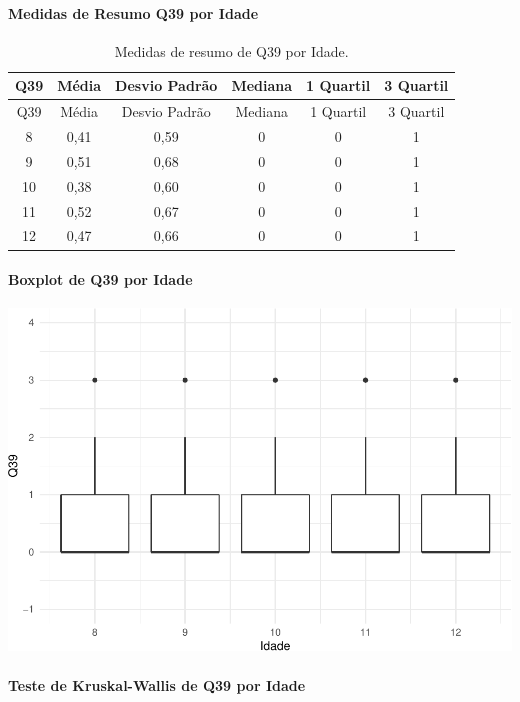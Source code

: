 \documentclass[]{article}
\let\oldparagraph\paragraph
\renewcommand{\paragraph}[1]{\oldparagraph{#1}\mbox{}}
\begin{document}
\cleardoublepage

\hypertarget{medidas-de-resumo-q39-por-idade}{%
\paragraph{Medidas de Resumo Q39 por Idade}\label{medidas-de-resumo-q39-por-idade}}

\begin{longtable}[]{@{}cccccc@{}}
\caption{\label{tab:unnamed-chunk-1512}Medidas de resumo de Q39 por Idade.}\tabularnewline
\toprule
Q39 & Média & Desvio Padrão & Mediana & 1 Quartil & 3 Quartil\tabularnewline
\midrule
\endfirsthead
\toprule
Q39 & Média & Desvio Padrão & Mediana & 1 Quartil & 3 Quartil\tabularnewline
\midrule
\endhead
8 & 0,41 & 0,59 & 0 & 0 & 1\tabularnewline
9 & 0,51 & 0,68 & 0 & 0 & 1\tabularnewline
10 & 0,38 & 0,60 & 0 & 0 & 1\tabularnewline
11 & 0,52 & 0,67 & 0 & 0 & 1\tabularnewline
12 & 0,47 & 0,66 & 0 & 0 & 1\tabularnewline
\bottomrule
\end{longtable}

\hypertarget{boxplot-de-q39-por-idade}{%
\paragraph{Boxplot de Q39 por Idade}\label{boxplot-de-q39-por-idade}}

\begin{center}\includegraphics[width=0.75\linewidth]{relatorio_covid19_files/figure-latex/unnamed-chunk-1513-1} \end{center}

\hypertarget{teste-de-kruskal-wallis-de-q39-por-idade}{%
\paragraph{Teste de Kruskal-Wallis de Q39 por Idade}\label{teste-de-kruskal-wallis-de-q39-por-idade}}
\end{document}
